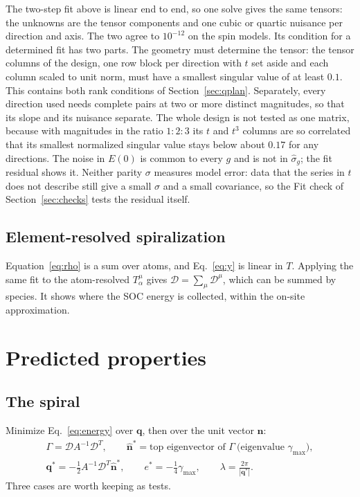 \documentclass[11pt,a4paper]{article}
\numberwithin{equation}{section}
\newcommand{\vct}[1]{\bm{#1}}
\newcommand{\nh}{\hat{\vct n}}
\newcommand{\qh}{\vct q}
\newcommand{\Dt}{\mathcal D}
\begin{document}
The two-step fit above is linear end to end, so one solve gives the same
tensors: the unknowns are the tensor components and one cubic or quartic
nuisance per direction and axis. The two agree to $10^{-12}$ on the spin
models. Its condition for a determined fit has two parts. The geometry must
determine the tensor: the tensor columns of the design, one row block per
direction with $t$ set aside and each column scaled to unit norm, must have a
smallest singular value of at least $0.1$. This contains both rank conditions of
Section~\ref{sec:qplan}. Separately, every direction used needs complete pairs
at two or more distinct magnitudes, so that its slope and its nuisance separate.
The whole design is not tested as one matrix, because with magnitudes in the
ratio $1{:}2{:}3$ its $t$ and $t^3$ columns are so correlated that its smallest
normalized singular value stays below about $0.17$ for any directions. The
noise in $E(0)$ is common to every $g$ and is not in $\hat\sigma_g$; the fit
residual shows it. Neither parity $\sigma$ measures model error: data that the
series in $t$ does not describe still give a small $\sigma$ and a small
covariance, so the Fit check of Section~\ref{sec:checks} tests the residual itself.

\subsection{Element-resolved spiralization}

Equation~\eqref{eq:rho} is a sum over atoms, and Eq.~\eqref{eq:y} is linear in
$T$. Applying the same fit to the atom-resolved $T^\mu_\alpha$ gives
$\Dt=\sum_\mu\Dt^\mu$, which can be summed by species. It shows
where the SOC energy is collected, within the on-site approximation.

\section{Predicted properties}\label{sec:predict}

\subsection{The spiral}

Minimize Eq.~\eqref{eq:energy} over $\qh$, then over the unit vector $\nh$:
\begin{equation}\label{eq:qstar}
 \boxed{\begin{gathered}
 \Gamma=\Dt A^{-1}\Dt^{T},\qquad
 \nh^*=\text{top eigenvector of }\Gamma\ \text{(eigenvalue $\gamma_{\max}$)},\\
 \qh^*=-\tfrac12A^{-1}\Dt^{T}\nh^*,\qquad
 e^*=-\tfrac14\gamma_{\max},\qquad
 \lambda=\frac{2\pi}{|\qh^*|}.
 \end{gathered}}
\end{equation}
Three cases are worth keeping as tests.
\end{document}
